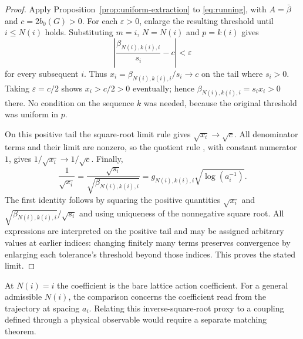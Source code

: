 \begin{proof}
Apply Proposition~\ref{prop:uniform-extraction} to \eqref{eq:running}, with
$A=\bar\beta$ and $c=2b_0(G)>0$. For each $\varepsilon>0$, enlarge the
resulting threshold until $i\le N(i)$ holds. Substituting
$m=i$, $N=N(i)$ and $p=k(i)$ gives
\[
 \left|\frac{\beta_{N(i),k(i),i}}{s_i}-c\right|<\varepsilon
\]
for every subsequent $i$. Thus $x_i=\beta_{N(i),k(i),i}/s_i\to c$ on the
tail where $s_i>0$. Taking $\varepsilon=c/2$ shows $x_i>c/2>0$ eventually;
hence $\beta_{N(i),k(i),i}=s_ix_i>0$ there. No condition on the sequence $k$
was needed, because the original threshold was uniform in $p$.

On this positive tail the square-root limit rule
\cite[Proposition~2.2.6]{lebl} gives $\sqrt{x_i}\to\sqrt c$.
All denominator terms and their limit are nonzero, so the quotient rule
\cite[Proposition~2.2.5(iv)]{lebl}, with constant numerator $1$, gives
$1/\sqrt{x_i}\to1/\sqrt c$. Finally,
\[
 \frac1{\sqrt{x_i}}
 =\frac{\sqrt{s_i}}{\sqrt{\beta_{N(i),k(i),i}}}
 =g_{N(i),k(i),i}\sqrt{\log(a_i^{-1})}.
\]
The first identity follows by squaring the positive quantities
$\sqrt{x_i}$ and $\sqrt{\beta_{N(i),k(i),i}}/\sqrt{s_i}$ and using uniqueness
of the nonnegative square root. All expressions are interpreted on the
positive tail and may be assigned arbitrary values at earlier indices:
changing finitely many terms preserves convergence by enlarging each tolerance's
threshold beyond those indices. This proves the stated limit.
\end{proof}

At \(N(i)=i\) the coefficient is the bare lattice action coefficient.
For a general admissible \(N(i)\), the comparison concerns the coefficient
read from the trajectory at spacing \(a_i\). Relating this inverse-square-root
proxy to a coupling defined through a physical observable would require a
separate matching theorem.
